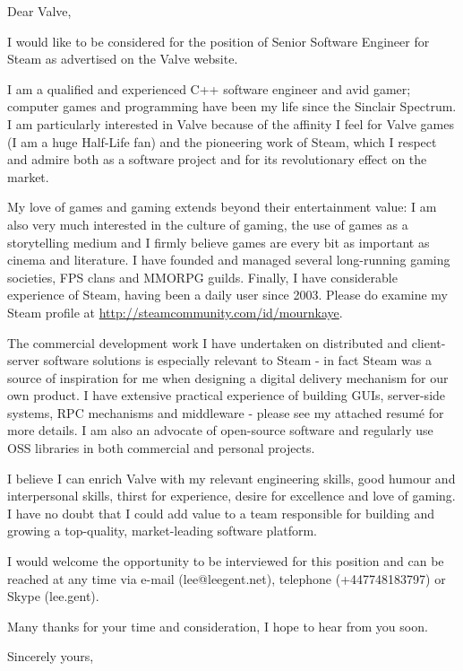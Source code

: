 \documentclass[a4paper,11pt]{letter}
\begin{document}
\begin{letter}{}
\opening{Dear Valve,}

I would like to be considered for the position of Senior Software Engineer for Steam as advertised on the Valve website.

I am a qualified and experienced C++ software engineer and avid gamer; computer games and programming have been my life since the Sinclair Spectrum.  I am particularly interested in Valve because of the affinity I feel for Valve games (I am a huge Half-Life fan) and the pioneering work of Steam, which I respect and admire both as a software project and for its revolutionary effect on the market.

My love of games and gaming extends beyond their entertainment value: I am also very much interested in the culture of gaming, the use of games as a storytelling medium and I firmly believe games are every bit as important as cinema and literature.  I have founded and managed several long-running gaming societies, FPS clans and MMORPG guilds.  Finally, I have considerable experience of Steam, having been a daily user since 2003.  Please do examine my Steam profile at \url{http://steamcommunity.com/id/mournkaye}.

The commercial development work I have undertaken on distributed and client-server software solutions is especially relevant to Steam - in fact Steam was a source of inspiration for me when designing a digital delivery mechanism for our own product.  I have extensive practical experience of building GUIs, server-side systems, RPC mechanisms and middleware - please see my attached resum\'{e} for more details.  I am also an advocate of open-source software and regularly use OSS libraries in both commercial and personal projects.

I believe I can enrich Valve with my relevant engineering skills, good humour and interpersonal skills, thirst for experience, desire for excellence and love of gaming.  I have no doubt that I could add value to a team responsible for building and growing a top-quality, market-leading software platform.

I would welcome the opportunity to be interviewed for this position and can be reached at any time via e-mail (lee@leegent.net), telephone (+447748183797) or Skype (lee.gent).

Many thanks for your time and consideration, I hope to hear from you soon.
\closing{Sincerely yours,\\
 \\
}
\end{letter}
\end{document}
